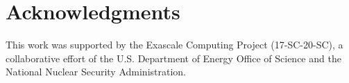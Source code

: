 \documentclass[../main.tex]{subfiles}
\begin{document}
\newpage

\section*{Acknowledgments}
\label{acknowledgements}

This work was supported by the Exascale Computing Project (17-SC-20-SC), a collaborative effort of the U.S. Department of Energy Office of Science and the National Nuclear Security Administration.
\end{document}
